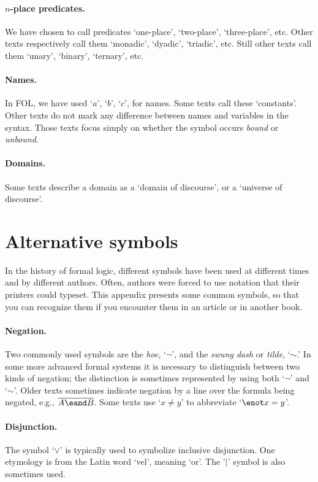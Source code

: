 \paragraph{$n$-place predicates.} We have chosen to call predicates `one-place', `two-place', `three-place', etc. Other texts respectively call them `monadic', `dyadic', `triadic', etc. Still other texts call them `unary', `binary', `ternary', etc.

\paragraph{Names.} In FOL, we have used `$a$', `$b$', `$c$', for names. Some texts call these `constants'. Other texts do not mark any difference between names and variables in the syntax. Those texts focus simply on  whether the symbol occurs \emph{bound} or \emph{unbound}.

\paragraph{Domains.} Some texts describe a domain as a `domain of discourse', or a `universe of discourse'.

\section{Alternative symbols}
In the history of formal logic, different symbols have been used at different times and by different authors. Often, authors were forced to use notation that their printers could typeset. This appendix presents some common symbols, so that you can recognize them if you encounter them in an article or in another book.

\paragraph{Negation.} Two commonly used symbols are the \emph{hoe}, `$\neg$', and the \emph{swung dash} or \emph{tilde}, `${\sim}$.' In some more advanced formal systems it is necessary to distinguish between two kinds of negation; the distinction is sometimes represented by using both `$\neg$' and `${\sim}$'. Older texts sometimes indicate negation by a line over the formula being negated, e.g., $\overline{A \eand B}$. Some texts use `$x \neq y$' to abbreviate `$\enot x = y$'.

\paragraph{Disjunction.} The symbol `$\vee$' is typically used to symbolize inclusive disjunction. One etymology is from the Latin word `vel', meaning `or'. The '$|$' symbol is also sometimes used.%

